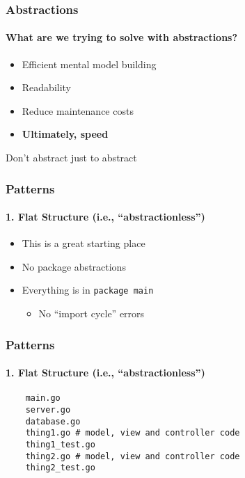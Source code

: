{
  \color{solarizedBase2}
\begin{frame}[fragile]
  \frametitle{Abstractions}
  \framesubtitle{What are we trying to solve with abstractions?}

  \begin{itemize}
    \item Efficient mental model building
    \item Readability
    \item Reduce maintenance costs
    \item \textbf{Ultimately, speed}
  \end{itemize}

  \vspace{1em}
  Don't abstract just to abstract
\end{frame}
}


\begin{frame}[fragile]
  \frametitle{Patterns}
  \framesubtitle{1. Flat Structure (i.e., ``abstractionless'')}

  \begin{itemize}
    \item This is a great starting place
    \pause
    \item No package abstractions
    \pause
    \item Everything is in \texttt{package main}
    \begin{itemize}
    \item No ``import cycle'' errors
    \end{itemize}
  \end{itemize}
\end{frame}

\begin{frame}[fragile]
  \frametitle{Patterns}
  \framesubtitle{1. Flat Structure (i.e., ``abstractionless'')}

  \begin{verbatim}
    main.go
    server.go
    database.go
    thing1.go # model, view and controller code
    thing1_test.go
    thing2.go # model, view and controller code
    thing2_test.go
  \end{verbatim}
\end{frame}


